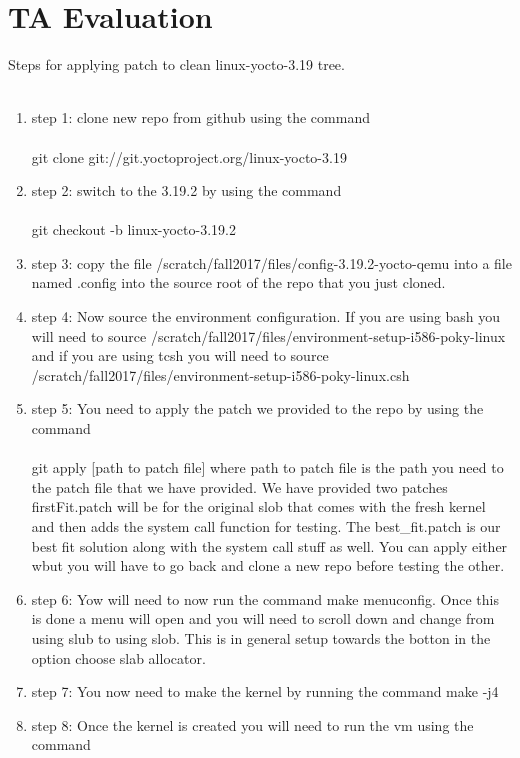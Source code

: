 \documentclass[letterpaper,10pt,titlepage]{article}
\begin{document}
\section{TA Evaluation}
Steps for applying patch to clean linux-yocto-3.19 tree.\\\\
\begin{enumerate}
\item{step 1: }
   clone new repo from github using the command\\\\
   git clone git://git.yoctoproject.org/linux-yocto-3.19
\item{step 2: }
   switch to the 3.19.2 by using the command\\\\
   git checkout -b linux-yocto-3.19.2
\item{step 3: }
   copy the file /scratch/fall2017/files/config-3.19.2-yocto-qemu into a file 
   named .config into the source root of the repo that you just cloned.
\item{step 4: }
   Now source the environment configuration. If you are using bash you will 
   need to source /scratch/fall2017/files/environment-setup-i586-poky-linux 
   and if you are using tcsh you will need  to source 
   /scratch/fall2017/files/environment-setup-i586-poky-linux.csh
\item{step 5: }
   You need to apply the patch we provided to the repo by using the command\\\\
   git apply [path to patch file] where path to patch file is the path you need 
   to the patch file that we have provided. We have provided two patches 
   firstFit.patch will be for the original slob that comes with the fresh kernel 
   and then adds the system call function for testing. The best\_fit.patch 
   is our best fit solution along with the system call stuff as well. You can 
   apply either wbut you will have to go back and clone a new repo before testing 
   the other. 
\item{step 6: } 
   Yow will need to now run the command make menuconfig. Once this is done a 
   menu will open and you will need to scroll down and change from using slub 
   to using slob. This is in general setup towards the botton in the option 
   choose slab allocator.
\item{step 7: }
   You now need to make the kernel by running the command make -j4 
\item{step 8: }
   Once the kernel is created you will need to run the vm using the command\\\\

\end{enumerate}
\end{document}
